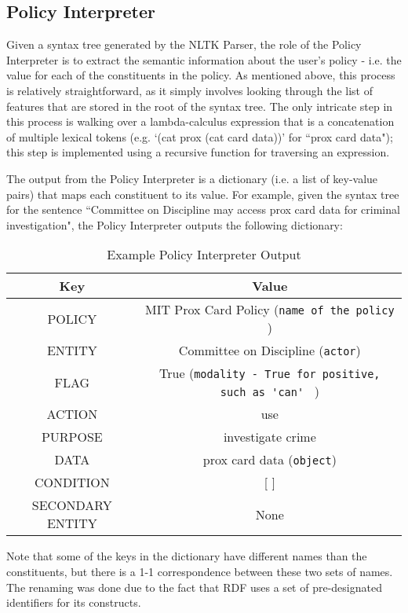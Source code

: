\documentclass{llncs}
\begin{document}

\subsection{Policy Interpreter}

Given a syntax tree generated by the NLTK Parser, the role of the Policy Interpreter is to extract the semantic information about the user's policy - i.e. the value for each of the constituents in the policy. As mentioned above, this process is relatively straightforward, as it simply involves looking through the list of features that are stored in the root of the syntax tree. The only intricate step in this process is walking over a lambda-calculus expression that is a concatenation of multiple lexical tokens (e.g. `(cat prox (cat card data))' for ``prox card data"); this step is implemented using a recursive function for traversing an expression.

The output from the Policy Interpreter is a dictionary (i.e. a list of key-value pairs) that maps each constituent to its value. For example, given the syntax tree for the sentence ``Committee on Discipline may access prox card data for criminal investigation", the Policy Interpreter outputs the following dictionary:

\begin{table}[h]
\centering
\begin{tabular}{|c|c|}
\hline
\textbf{Key} & \textbf{Value}\\
\hline
POLICY & MIT Prox Card Policy (\verb!name of the policy! )\\
ENTITY & Committee on Discipline (\verb!actor!)\\
FLAG & True (\verb!modality - True for positive, such as 'can' ! )\\
ACTION & use \\
PURPOSE &investigate crime \\
DATA & prox card data (\verb!object!) \\
CONDITION  &[  ] \\
SECONDARY ENTITY & None\\
\hline
\end{tabular}
\caption{Example Policy Interpreter Output}
\label{tab:policy-interpreter-output}
\end{table}

Note that some of the keys in the dictionary have different names than the constituents, but there is a 1-1 correspondence between these two sets of names. The renaming was done due to the fact that RDF uses a set of pre-designated identifiers for its constructs. 
\end{document}
